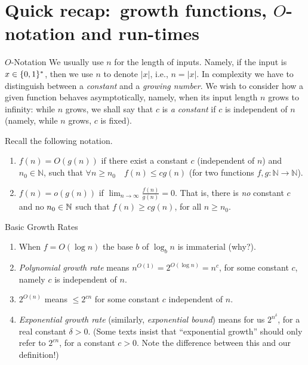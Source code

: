 \section{Quick recap:\ growth functions, $O$-notation and run-times}



\begin{trailer}{$O$-Notation}
    We usually use $n$ for the length of inputs. Namely, if the input is $x\in\{0,1\}^*$, then we use $n$ to denote $|x|$, i.e., $n=|x|$. In complexity we have to distinguish between a \emph{constant} and a \emph{growing number}. We wish to consider how a given function behaves asymptotically, namely, when its input length $n$ grows to infinity: while $n$ grows, we shall say that $c$ is \emph{a constant} if $c$ is independent of $n$ (namely, while $n$ grows, $c$ is fixed).  


Recall the following notation.
\begin{enumerate}
    \item 
 $f(n)=O(g(n))$ if there exist a constant $c$ (independent of $n$) and $n_0 \in \mathbb{N}$, such that  $\forall n \geq n_0 \quad f(n) \leq c g(n) $ (for two functions  $f, g: \mathbb{N} \rightarrow \mathbb{N}$).

\item $f(n)=o(g(n))$ if $\lim _{n \rightarrow \infty} \frac{f(n)}{g(n)}=0$. That is, there is \emph{no} constant $c$ and no $n_0\in\mathbb{N}$ such that $f(n)\ge cg(n)$, for all $n\ge n_0$.
\end{enumerate}
\end{trailer}

\begin{trailer}{Basic Growth Rates}
\begin{enumerate}
    \item When $f=O\left(\log n\right)$ the base $b$ of $\log _b n$ is immaterial (why?).
    
    \item \emph{Polynomial growth rate} means $n^{O(1)}=2^{O\left(\log n\right)}=n^c$, for some constant $c$, namely $c$ is independent of $n$.
    
      \item $2^{O(n)}$ means $\leq 2^{c n}$ for some constant $c$ independent of $n$.
    
    \item \emph{Exponential growth rate} (similarly, \emph{exponential bound})  means for us $2^{n^\delta}$, for a real constant $\delta>0$. (Some texts insist that ``exponential growth'' should only refer to $2^{cn}$, for a constant $c>0$. Note the difference between this and our definition!)
\end{enumerate}
\end{trailer}




